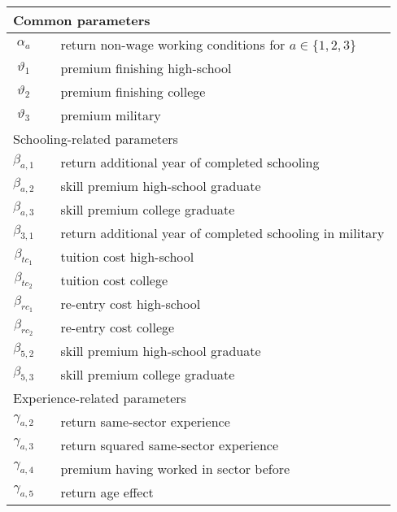 \begin{ThreePartTable}
\begin{longtable}{@{}cll@{}}
\midrule
\multicolumn{3}{l}{Common parameters}																			 \\ \midrule
$\alpha_a$           &  & return non-wage working conditions for $a \in \{1 ,2 ,3 \}$		   \\
$\vartheta_1$        &  & premium finishing high-school                 								    \\
$\vartheta_2$        &  & premium finishing college															    \\
$\vartheta_3$        &  & premium military                              											  \\[7.5pt] \midrule 
\multicolumn{3}{l}{Schooling-related parameters}															   \\ \midrule
$\beta_{a,1}$        &  & return additional year of completed schooling 							   \\
$\beta_{a,2}$        &  & skill premium high-school graduate            									\\
$\beta_{a,3}$        &  & skill premium college graduate													   	\\
$\beta_{3,1}$        &  & return additional year of completed schooling in military					\\
$\beta_{tc_1}$       &  & tuition cost high-school                      											\\
$\beta_{tc_2}$       &  & tuition cost college                          												\\
$\beta_{rc_1}$       &  & re-entry cost high-school                     										   \\
$\beta_{rc_2}$       &  & re-entry cost college                        												   \\
$\beta_{5,2}$        &  & skill premium high-school graduate            									\\
$\beta_{5,3}$        &  & skill premium college graduate                									     \\ [7.5pt] \midrule
\multicolumn{3}{l}{Experience-related parameters}           													 \\
\midrule 
$\gamma_{a,2}$       &  & return same-sector experience                 									 \\
$\gamma_{a,3}$       &  & return squared same-sector experience         								\\
$\gamma_{a,4}$       &  & premium having worked in sector before        							   \\
$\gamma_{a,5}$       &  & return age effect                             											     \\

\end{longtable}
\end{ThreePartTable}

